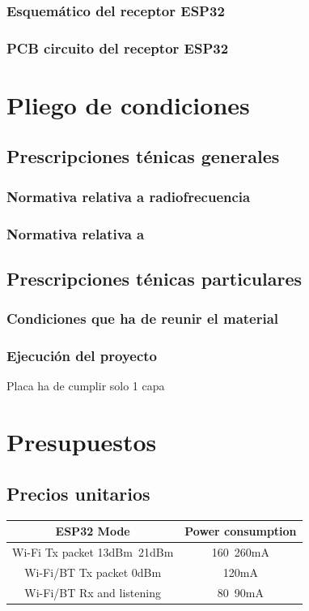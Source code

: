 \documentclass[a4paper ,12pt, onecolumn]{article}
\begin{document}
        \subsubsection{Esquemático del receptor ESP32}
        \subsubsection{PCB circuito del receptor ESP32}
\section{Pliego de condiciones}
    \subsection{Prescripciones ténicas generales}
        \subsubsection{Normativa relativa a radiofrecuencia}
        \subsubsection{Normativa relativa a }
    \subsection{Prescripciones ténicas particulares}
        \subsubsection{Condiciones que ha de reunir el material}
        \subsubsection{Ejecución del proyecto}
        Placa ha de cumplir solo 1 capa
\section{Presupuestos}
    \subsection{Precios unitarios}
        \begin{center}
            \begin{tabular}{||c | c ||} 
            \hline
            ESP32 Mode & Power consumption  \\ [0.5ex] 
            \hline\hline
            Wi-Fi Tx packet 13dBm~21dBm & 160~260mA  \\ 
            \hline
            Wi-Fi/BT Tx packet 0dBm	 & 120mA  \\
            \hline
            Wi-Fi/BT Rx and listening & 80~90mA  \\
            \hline
            \end{tabular}
        \end{center}
\end{document}
